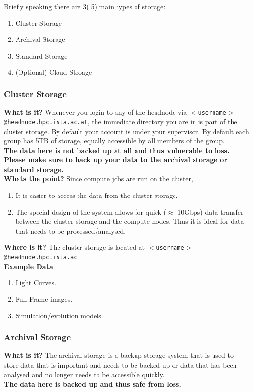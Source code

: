 \documentclass{article}
\begin{document}
Briefly speaking there are 3(.5) main types of storage:
\begin{enumerate}
    \item Cluster Storage
    \item Archival Storage
    \item Standard Storage
    \item (Optional) Cloud Stroage
\end{enumerate}
\subsubsection{Cluster Storage}
\textbf{What is it?}
\newline
Whenever you login to any of the headnode via \texttt{$<$username$>$@headnode.hpc.ista.ac.at}, the immediate directory you are in is part of the cluster storage. By default your account is under your supervisor. By default each group has 5TB of storage, equally accessible by all members of the group.
\\
\textbf{The data here is not backed up at all and thus vulnerable to loss. Please make sure to back up your data to the archival storage or standard storage.}
\\

\noindent
\textbf{Whats the point?}
\newline
Since compute jobs are run on the cluster, 
\begin{enumerate}
    \item It is easier to access the data from the cluster storage.
    \item The special design of the system allows for quick ($\approx$ 10Gbps) data transfer between the cluster storage and the compute nodes. Thus it is ideal for data that needs to be processed/analysed.
\end{enumerate}

\noindent
\textbf{Where is it?}
\newline
The cluster storage is located at \texttt{$<$username$>$@headnode.hpc.ista.ac}.
\\

\noindent
\textbf{Example Data}
\begin{enumerate}
    \item Light Curves.
    \item Full Frame images.
    \item Simulation/evolution models.
\end{enumerate}
\subsubsection{Archival Storage}
\textbf{What is it?}
\newline
The archival storage is a backup storage system that is used to store data that is important and needs to be backed up or data that has been analysed and no longer needs to be accessible quickly.
\\
\textbf{The data here is backed up and thus safe from loss.}
\\
\end{document}
